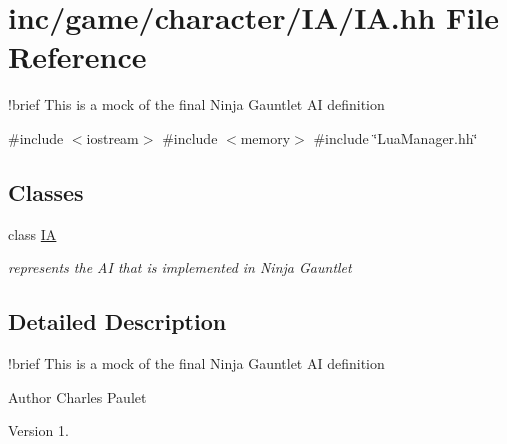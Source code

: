 \hypertarget{IA_8hh}{}\section{inc/game/character/\+I\+A/\+IA.hh File Reference}
\label{IA_8hh}


!brief This is a mock of the final Ninja Gauntlet AI definition  


{\ttfamily \#include $<$iostream$>$}\newline
{\ttfamily \#include $<$memory$>$}\newline
{\ttfamily \#include \char`\"{}Lua\+Manager.\+hh\char`\"{}}\newline
\subsection*{Classes}
\begin{DoxyCompactItemize}
\item 
class \hyperlink{classIA}{IA}
\begin{DoxyCompactList}\small\item\em represents the AI that is implemented in Ninja Gauntlet \end{DoxyCompactList}\end{DoxyCompactItemize}


\subsection{Detailed Description}
!brief This is a mock of the final Ninja Gauntlet AI definition 

\begin{DoxyAuthor}{Author}
Charles Paulet 
\end{DoxyAuthor}
\begin{DoxyVersion}{Version}
1. 
\end{DoxyVersion}
